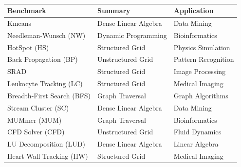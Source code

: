 \documentclass{thesis}
\begin{document}
\begin{center}
\begin{table}[h!]
\begin{latin}
\begin{tabular}{|p{}|p{}|p{}|}
\hline
Benchmark & Summary & Application \\
\hline
Kmeans & Dense Linear Algebra & Data Mining \\
\hline
Needleman-Wunsch (NW) & Dynamic Programming & Bioinformatics \\
\hline
HotSpot (HS) & Structured Grid & Physics Simulation \\
\hline
Back Propagation (BP) & Unstructured Grid & Pattern Recognition \\
\hline
SRAD & Structured Grid & Image Processing \\
\hline
Leukocyte Tracking (LC) & Structured Grid & Medical Imaging \\
\hline
Breadth-First Search (BFS) & Graph Traversal & Graph Algorithms \\
\hline
Stream Cluster (SC) & Dense Linear Algebra & Data Mining \\
\hline
MUMmer (MUM) & Graph Traversal & Bioinformatics \\
\hline
CFD Solver (CFD) & Unstructured Grid & Fluid Dynamics \\
\hline
LU Decomposition (LUD) & Dense Linear Algebra & Linear Algebra \\
\hline
Heart Wall Tracking (HW) & Structured Grid & Medical Imaging \\
\hline
\end{tabular}
\end{latin}
\caption{%
}
\label{table:parboilbenchmarks}
\end{table}
\end{center}
\end{document}
